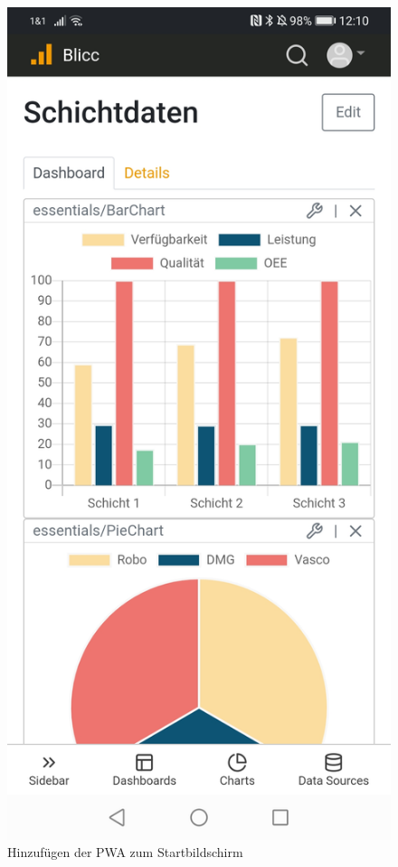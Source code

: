 \begin{figure}[h]
    \includegraphics[scale=0.15]{img/android/Installed}
    \caption{Hinzufügen der PWA zum Startbildschirm}
    \label{figure:hinzufuegenderpwazumstartbildschirm}
\end{figure}

